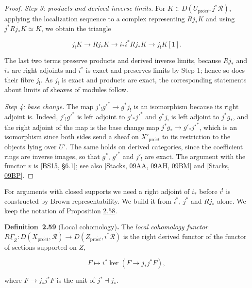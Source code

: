\documentclass[11pt]{article}
\newenvironment{bpstatement}[2]{\par\addvspace{0.6\baselineskip}\noindent\textbf{#1}#2\textbf{.}\enspace\ignorespaces}
  {\par\addvspace{0.4\baselineskip}}
\begin{document}
\begin{proof}[{Proof}]
\emph{Step 3: products and derived inverse limits.} For \(K\in D(U_{\mathrm{pro}\acute{e}t},j^*\mathcal R)\), applying the localization sequence to a complex representing \(Rj_*K\) and using \(j^*Rj_*K\simeq K\), we obtain the triangle

\[
j_!K\longrightarrow Rj_*K\longrightarrow i_*i^*Rj_*K
\longrightarrow j_!K[1].
\]

The last two terms preserve products and derived inverse limits, because \(Rj_*\) and \(i_*\) are right adjoints and \(i^*\) is exact and preserves limits by Step 1; hence so does their fibre \(j_!\). As \(j_!\) is exact and products are exact, the corresponding statements about limits of sheaves of modules follow.

\emph{Step 4: base change.} The map \(j'_!g'^*\to g^*j_!\) is an isomorphism because its right adjoint is. Indeed, \(j'_!g'^*\) is left adjoint to \(g'_*j'^*\) and \(g^*j_!\) is left adjoint to \(j^*g_*\), and the right adjoint of the map is the base change map \(j^*g_*\to g'_*j'^*\), which is an isomorphism since both sides send a sheaf on \(X'_{\mathrm{pro}\acute{e}t}\) to its restriction to the objects lying over \(U'\). The same holds on derived categories, since the coefficient rings are inverse images, so that \(g^*\), \(g'^*\) and \(j'_!\) are exact. The argument with the functor \(v\) is [\hyperref[bp705]{BS15}, §6.1]; see also [Stacks, \href{https://stacks.math.columbia.edu/tag/09AA}{09AA}, \href{https://stacks.math.columbia.edu/tag/09AH}{09AH}, \href{https://stacks.math.columbia.edu/tag/09BM}{09BM}] and [Stacks, \href{https://stacks.math.columbia.edu/tag/09BP}{09BP}].
\end{proof}

\label{bp183}%
For arguments with closed supports we need a right adjoint of \(i_*\) before \(i^!\) is constructed by Brown representability. We build it from \(i^*\), \(j^*\) and \(Rj_*\) alone. We keep the notation of Proposition \hyperref[bp181]{2.58}.

\label{bp184}%
\begin{bpstatement}{Definition~2.59}{ (Local cohomology)}
The \emph{local cohomology functor} \(R\underline\Gamma_Z:D(X_{\mathrm{pro}\acute{e}t},\mathcal R)\to D(Z_{\mathrm{pro}\acute{e}t},i^*\mathcal R)\) is the right derived functor of the functor of sections supported on \(Z\),

\[
F\longmapsto i^*\ker(F\longrightarrow j_*j^*F),
\]

where \(F\to j_*j^*F\) is the unit of \(j^*\dashv j_*\).
\end{bpstatement}
\end{document}
